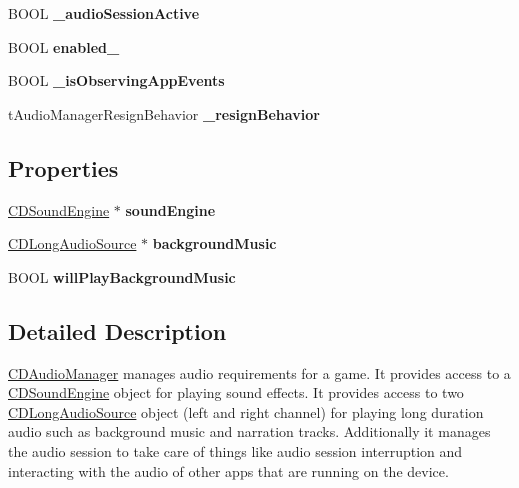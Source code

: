 \begin{DoxyCompactItemize}
B\+O\+OL {\bfseries \+\_\+audio\+Session\+Active}
\item 
\mbox{\label{interfaceCDAudioManager_a91ce224485b38f8cbdd32443b73fa72d}} 
B\+O\+OL {\bfseries enabled\+\_\+}
\item 
\mbox{\label{interfaceCDAudioManager_aca6d7170a7ac7e6c0b109d3805fc2cb3}} 
B\+O\+OL {\bfseries \+\_\+is\+Observing\+App\+Events}
\item 
\mbox{\label{interfaceCDAudioManager_ad993da9d1c8f07f50ff6e9bc5481f774}} 
t\+Audio\+Manager\+Resign\+Behavior {\bfseries \+\_\+resign\+Behavior}
\end{DoxyCompactItemize}
\subsection*{Properties}
\begin{DoxyCompactItemize}
\item 
\mbox{\label{interfaceCDAudioManager_a803ed647e9c1e174a5c03ded3b76dd63}} 
\hyperlink{interfaceCDSoundEngine}{C\+D\+Sound\+Engine} $\ast$ {\bfseries sound\+Engine}
\item 
\mbox{\label{interfaceCDAudioManager_a533f9e39b345dfebf5708f3411cd5484}} 
\hyperlink{interfaceCDLongAudioSource}{C\+D\+Long\+Audio\+Source} $\ast$ {\bfseries background\+Music}
\item 
\mbox{\label{interfaceCDAudioManager_aca1dba6de45c7939fa8cec46d2500ece}} 
B\+O\+OL {\bfseries will\+Play\+Background\+Music}
\end{DoxyCompactItemize}


\subsection{Detailed Description}
\hyperlink{interfaceCDAudioManager}{C\+D\+Audio\+Manager} manages audio requirements for a game. It provides access to a \hyperlink{interfaceCDSoundEngine}{C\+D\+Sound\+Engine} object for playing sound effects. It provides access to two \hyperlink{interfaceCDLongAudioSource}{C\+D\+Long\+Audio\+Source} object (left and right channel) for playing long duration audio such as background music and narration tracks. Additionally it manages the audio session to take care of things like audio session interruption and interacting with the audio of other apps that are running on the device.

